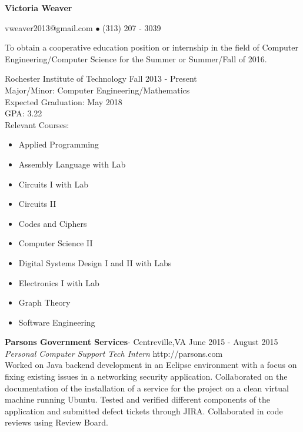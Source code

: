\documentclass[10pt]{article} %
\begin{document}
	\centerline{\LARGE \bf Victoria Weaver}
	\centerline{vweaver2013@gmail.com $\bullet$ (313) 207 - 3039}
\noindent\makebox[\linewidth]{\rule{\textwidth}{1pt}}

\bigskip


\newline
	To obtain a cooperative education position or internship in the field of Computer Engineering/Computer Science for the Summer or Summer/Fall of 2016.


\bigskip


\newline
	Rochester Institute of Technology	\hfill Fall 2013 - Present
	\\ Major/Minor: Computer Engineering/Mathematics
	\\ Expected Graduation: May 2018
	\\ GPA: 3.22
	\\ Relevant Courses: \begin{multicols}{3}
		\begin{itemize}
			\itemsep0em 
			\item Applied Programming
			\item Assembly Language with Lab
			\item Circuits I with Lab
			\item Circuits II
			\item Codes and Ciphers
			\item Computer Science II
			\item Digital Systems Design I and II with Labs
			\item Electronics I with Lab
			\item Graph Theory
			\item Software Engineering
		\end{itemize}
		\end{multicols}



\newline
	\textbf{Parsons Government Services}- Centreville,VA			\hfill June 2015 - August 2015 \\
	\textit{Personal Computer Support Tech Intern}	\hfill http://parsons.com \\
	\indent Worked on Java backend development in an Eclipse environment with a focus on fixing existing issues in a networking security application.  Collaborated on the documentation of the installation of a service for the project on a clean virtual machine running Ubuntu.  Tested and verified different components of the application and submitted defect tickets through JIRA.  Collaborated in code reviews using Review Board.
	
\end{document}
